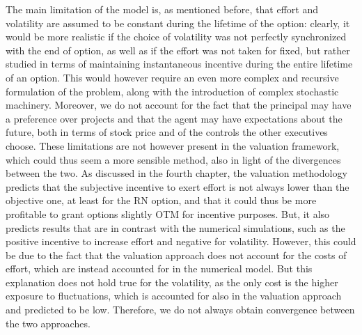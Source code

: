 The main limitation of the model is, as mentioned before, that effort and volatility are assumed to be constant during the lifetime of the option: clearly, it would be more realistic if the choice of volatility was not perfectly synchronized with the end of option, as well as if the effort was not taken for fixed, but rather studied in terms of maintaining instantaneous incentive during the entire lifetime of an option. This would however require an even more complex and recursive formulation of the problem, along with the introduction of complex stochastic machinery. Moreover, we do not account for the fact that the principal may have a preference over projects and that the agent may have expectations about the future, both in terms of stock price and of the controls the other executives choose. These limitations are not however present in the valuation framework, which could thus seem a more sensible method, also in light of the divergences between the two. As discussed in the fourth chapter, the valuation methodology predicts that the subjective incentive to exert effort is not always lower than the objective one, at least for the RN option, and that it could thus be more profitable to grant options slightly OTM for incentive purposes. But, it also predicts results that are in contrast with the numerical simulations, such as the positive incentive to increase effort and negative for volatility. However, this could be due to the fact that the valuation approach does not account for the costs of effort, which are instead accounted for in the numerical model. But this explanation does not hold true for the volatility, as the only cost is the higher exposure to fluctuations, which is accounted for also in the valuation approach and predicted to be low. Therefore, we do not always obtain convergence between the two approaches.

